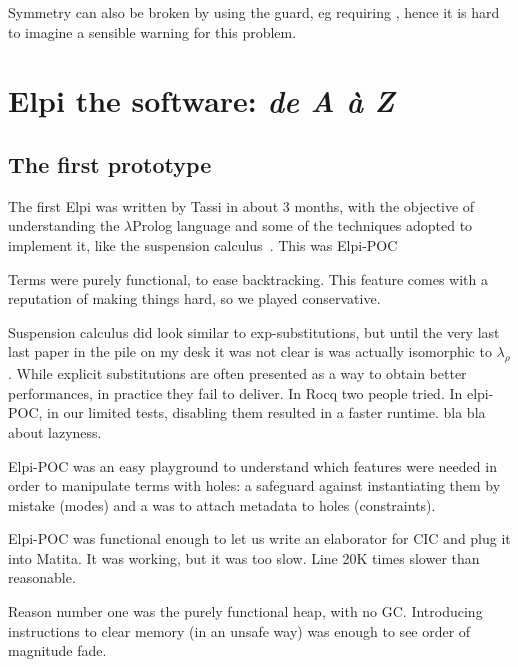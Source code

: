 \documentclass[a4paper, 11pt]{book}
\begin{document}
Symmetry can also be broken by using the guard, eg
requiring , hence it is hard to imagine a
sensible warning for this problem.



\chapter{Elpi the software: \emph{de A \`a Z}}

\section{The first prototype}\label{sec:poc}

The first Elpi was written by Tassi in about 3 months, with the objective
of understanding the $\lambda$Prolog language and some of the techniques
adopted to implement it, like the suspension calculus~\cite{NADATHUR200235}.
This was Elpi-POC

Terms were purely functional, to ease backtracking. This feature comes
with a reputation of making things hard, so we played conservative.

Suspension calculus did look similar to exp-substitutions, but until the very
last last paper in the pile on my desk it was not clear is was actually isomorphic
to $\lambda_\rho$. While explicit substitutions are often presented as a way to
obtain better performances, in practice they fail to deliver. In Rocq two
people tried. In elpi-POC, in our limited tests, disabling them resulted in
a faster runtime.  bla bla about lazyness.

Elpi-POC was an easy playground to understand which features were needed in
order to manipulate terms with holes: a safeguard against instantiating them by
mistake (modes) and a was to attach metadata to holes (constraints).

Elpi-POC was functional enough to let us write an elaborator for CIC
and plug it into Matita. It was working, but it was too slow. Line 20K times
slower than reasonable.

Reason number one was the purely functional heap, with no GC. Introducing 
instructions to clear memory (in an unsafe way) was enough to see order of
magnitude fade.
\end{document}
